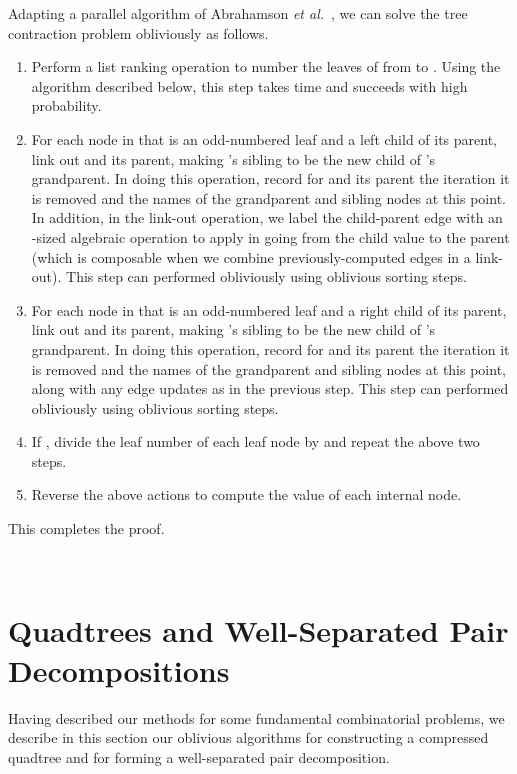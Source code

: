 \documentclass[11pt]{article}
\newenvironment{proof}{\begin{normalsize}\noindent{\bf Proof:}}{  \end{normalsize} \\}
\newcommand{\qed}{}
\begin{document}
{\begin{proof}
Adapting a parallel algorithm of Abrahamson {\it et al.}~\cite{adkp-sptca-89},
we can solve the tree contraction problem obliviously as follows.
\begin{enumerate}
\item
Perform a list ranking operation to number the leaves of  from  to .
Using the algorithm described below, this step takes  time and succeeds
with high probability.
\item
For each node  in  that is an odd-numbered leaf 
and a left child of its parent, link
out  and its parent, making 's sibling to be the new child of 's
grandparent. In doing this operation, record for  and its parent
the iteration it is removed and the names of the grandparent and sibling
nodes at this point.
In addition, in the link-out operation, we label the child-parent edge with
an -sized algebraic operation to apply in going from the child value to
the parent (which is composable when we combine previously-computed edges in
a link-out).
This step can performed obliviously using  oblivious sorting steps.
\item
For each node  in  that is an odd-numbered leaf 
and a right child of its parent, link
out  and its parent, making 's sibling to be the new child of 's
grandparent. In doing this operation, record for  and its parent
the iteration it is removed and the names of the grandparent and sibling
nodes at this point, along with any edge updates as in the previous step.
This step can performed obliviously using  oblivious sorting steps.
\item
If ,
divide the leaf number of each leaf node by  and repeat the above two
steps.
\item
Reverse the above actions to compute the value of each internal node.
\end{enumerate}
This completes the proof.
\qed
\end{proof}



\section{Quadtrees and Well-Separated Pair Decompositions}
Having described our methods for some fundamental combinatorial problems,
we describe in this section our oblivious algorithms for 
constructing a compressed quadtree and for forming a well-separated pair
decomposition.

}
\end{document}
